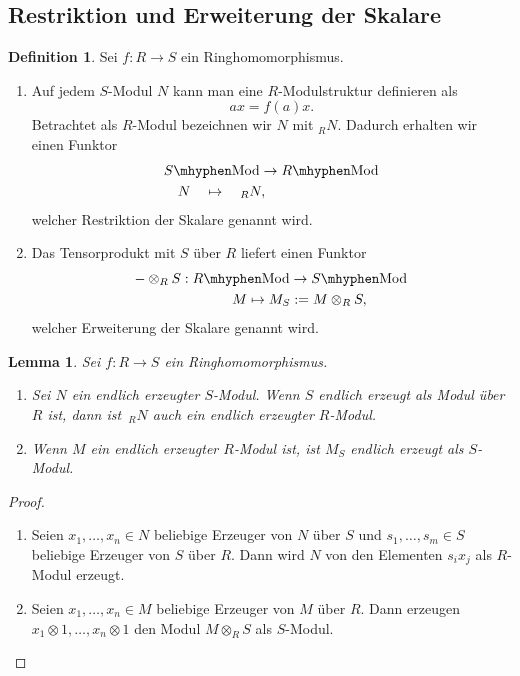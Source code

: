 \documentclass[reqno,12pt]{article}
\numberwithin{equation}{section}
\theoremstyle{plain}
\newtheorem{lemma}[thm]{Lemma}
\theoremstyle{definition}
\newtheorem{definition}[thm]{Definition}
\newcommand{\blank}{{-}}
\newcommand{\Mod}{\text{Mod}}
\begin{document}
\subsection{Restriktion und Erweiterung der Skalare}



\begin{definition}
Sei $f \colon R \to S$ ein Ringhomomorphismus.
\begin{enumerate}
\item Auf jedem $S$-Modul $N$ kann man eine $R$-Modulstruktur definieren als
$$
a x = f(a)x.
$$
Betrachtet als $R$-Modul bezeichnen wir $N$ mit ${}_RN$. Dadurch erhalten wir einen Funktor
\begin{align*}
& S \mhyphen \Mod \to R \mhyphen \Mod \\
& \quad N  \quad \mapsto \quad  {}_RN,
\end{align*}
welcher {\sf Restriktion der Skalare} genannt wird.

\item Das Tensorprodukt mit $S$ über $R$ liefert einen Funktor
\begin{align*}
& \blank \otimes_R S: R \mhyphen \Mod \to S \mhyphen \Mod \\
& \hspace{70pt} M \mapsto M_S:=M \otimes_R S,
\end{align*}
welcher {\sf Erweiterung der Skalare} genannt wird.
\end{enumerate}
\end{definition}

\begin{lemma}
Sei $f \colon R \to S$ ein Ringhomomorphismus.
\begin{enumerate}
\item Sei $N$ ein endlich erzeugter $S$-Modul. Wenn $S$ endlich erzeugt als Modul über $R$ ist, dann ist~${}_RN$ auch ein endlich erzeugter $R$-Modul.

\item Wenn $M$ ein endlich erzeugter $R$-Modul ist, ist $M_S$ endlich erzeugt als $S$-Modul.
\end{enumerate}
\end{lemma}

\begin{proof}
\
\begin{enumerate}
\item Seien $x_1, \dots , x_n \in N$ beliebige Erzeuger von $N$ über $S$ und $s_1, \dots , s_m \in S$ beliebige Erzeuger von $S$ über $R$. Dann wird $N$ von den Elementen $s_ix_j$ als $R$-Modul erzeugt.


\item Seien $x_1, \dots , x_n \in M$ beliebige Erzeuger von $M$ über $R$. Dann erzeugen $x_1 \otimes 1, \dots , x_n \otimes 1$ den Modul $M \otimes_R S$ als $S$-Modul.
\end{enumerate}
\end{proof}
\end{document}
